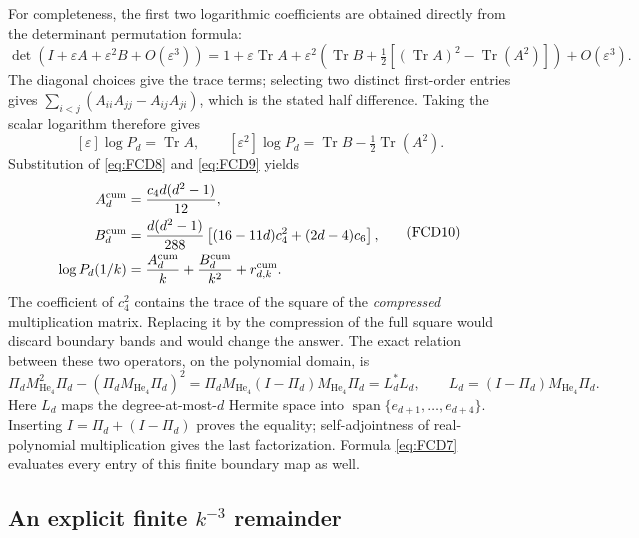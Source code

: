 \documentclass[11pt]{article}
\begin{document}
For completeness, the first two logarithmic coefficients are obtained
directly from the determinant permutation formula:
\[
 \det(I+\varepsilon A+\varepsilon^2B+O(\varepsilon^3))
 =1+\varepsilon\operatorname{Tr}A+
 \varepsilon^2\left(\operatorname{Tr}B+
    \tfrac12[(\operatorname{Tr}A)^2-\operatorname{Tr}(A^2)]\right)
 +O(\varepsilon^3).
\]
The diagonal choices give the trace terms; selecting two distinct
first-order entries gives
\(\sum_{i<j}(A_{ii}A_{jj}-A_{ij}A_{ji})\), which is the stated half
difference. Taking the scalar logarithm therefore gives
\[
 [\varepsilon]\log P_d=\operatorname{Tr}A,\qquad
 [\varepsilon^2]\log P_d=\operatorname{Tr}B-\tfrac12\operatorname{Tr}(A^2).
\]
Substitution of \eqref{eq:FCD8} and \eqref{eq:FCD9} yields
\begin{equation}
 \begin{split}
 A_d^{\rm cum}&=\frac{c_4d(d^2-1)}{12},\\
 B_d^{\rm cum}
   &=\frac{d(d^2-1)}{288}
                \left[(16-11d)c_4^2+(2d-4)c_6\right],\\
 \log P_d(1/k)&=\frac{A_d^{\rm cum}}k
                         +\frac{B_d^{\rm cum}}{k^2}
                         +r_{d,k}^{\rm cum}.
 \end{split}
 \tag{FCD10}\label{eq:FCD10}
\end{equation}
The coefficient of \(c_4^2\) contains the trace of the
square of the \emph{compressed} multiplication matrix. Replacing it
by the compression of the full square would discard boundary bands and
would change the answer.
The exact relation between these two operators, on the polynomial domain,
is
\[
 \Pi_d M_{\operatorname{He}_4}^2\Pi_d
       -(\Pi_dM_{\operatorname{He}_4}\Pi_d)^2
   =\Pi_dM_{\operatorname{He}_4}(I-\Pi_d)
                             M_{\operatorname{He}_4}\Pi_d
   =L_d^*L_d,\qquad
 L_d=(I-\Pi_d)M_{\operatorname{He}_4}\Pi_d .
\]
Here \(L_d\) maps the degree-at-most-\(d\) Hermite space into
\(\operatorname{span}\{e_{d+1},\ldots,e_{d+4}\}\).
Inserting \(I=\Pi_d+(I-\Pi_d)\) proves the equality;
self-adjointness of real-polynomial multiplication gives the last
factorization. Formula \eqref{eq:FCD7} evaluates every entry of
this finite boundary map as well.

\subsection{An explicit finite \(k^{-3}\) remainder}
\end{document}
